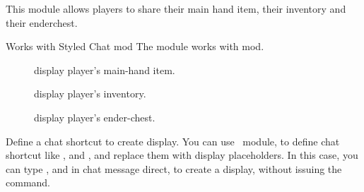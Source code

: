 This module allows players to share their main hand item, their inventory and their enderchest.

\begin{tips}{Works with Styled Chat mod}
    The  module works with  mod.
\end{tips}


\begin{description}
    \item [] display player's main-hand item.
    \item[] display player's inventory.
    \item[] display player's ender-chest.
\end{description}

\begin{example}{Define a chat shortcut to create display.}
    You can use~ module, to define chat shortcut like ,  and , and replace them with display placeholders.
    In this case, you can type ,  and  in chat message direct, to create a display, without issuing the command.
\end{example}
